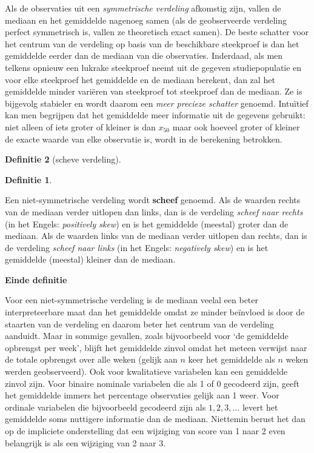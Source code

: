 \documentclass[
  12pt,dutch,coursenotes]{book}
\theoremstyle{definition}
\newtheorem{definition}{Definitie}[chapter]
\theoremstyle{definition}
\theoremstyle{definition}
\theoremstyle{remark}
\begin{document}
Als de observaties uit een \emph{symmetrische verdeling} afkomstig zijn,
vallen de mediaan en het gemiddelde nagenoeg samen (als de geobserveerde
verdeling perfect symmetrisch is, vallen ze theoretisch exact samen).
De beste schatter voor het centrum van de verdeling op basis van de beschikbare
steekproef is dan het gemiddelde eerder dan de mediaan van die observaties.
Inderdaad, als men telkens opnieuw een lukrake steekproef neemt uit de
gegeven studiepopulatie en voor elke steekproef het gemiddelde en de mediaan
berekent, dan zal het gemiddelde minder variëren van steekproef tot
steekproef dan de mediaan. Ze is bijgevolg stabieler en wordt daarom een
\emph{meer precieze schatter} genoemd. Intuïtief kan men begrijpen dat
het gemiddelde meer informatie uit de gegevens gebruikt: niet alleen of iets
groter of kleiner is dan \(x_{50}\) maar ook hoeveel groter of kleiner de
exacte waarde van elke observatie is, wordt in de berekening betrokken.

\begin{definition}[scheve verdeling]
\begin{definition}

\protect\hypertarget{def:unnamed-chunk-98}{}{\label{def:unnamed-chunk-98} \iffalse (scheve verdeling) \fi{} }

\end{definition}
\end{definition}

Een niet-symmetrische verdeling wordt \textbf{scheef} genoemd. Als de
waarden rechts van de mediaan verder uitlopen dan links, dan is de verdeling
\emph{scheef naar rechts} (in het Engels: \emph{positively skew}) en is
het gemiddelde (meestal) groter dan de mediaan. Als de waarden links van de
mediaan verder uitlopen dan rechts, dan is de verdeling \emph{scheef naar
links} (in het Engels: \emph{negatively skew}) en is het gemiddelde
(meestal) kleiner dan de mediaan.

\textbf{Einde definitie}

Voor een niet-symmetrische verdeling is de mediaan veelal een beter
interpreteerbare maat dan het gemiddelde omdat ze minder beïnvloed is
door de staarten van de verdeling en daarom beter het centrum van de
verdeling aanduidt. Maar in sommige gevallen, zoals bijvoorbeeld voor `de
gemiddelde opbrengst per week', blijft het gemiddelde zinvol omdat het
meteen verwijst naar de totale opbrengst over alle weken (gelijk aan \(n\)
keer het gemiddelde als \(n\) weken werden geobserveerd). Ook voor
kwalitatieve variabelen kan een gemiddelde zinvol zijn. Voor binaire
nominale variabelen die als 1 of 0 gecodeerd zijn, geeft het gemiddelde
immers het percentage observaties gelijk aan 1 weer. Voor ordinale
variabelen die bijvoorbeeld gecodeerd zijn als \(1, 2, 3, ...\) levert het
gemiddelde soms nuttigere informatie dan de mediaan. Niettemin berust het
dan op de impliciete onderstelling dat een wijziging van score van 1 naar 2
even belangrijk is als een wijziging van 2 naar 3.
\end{document}
